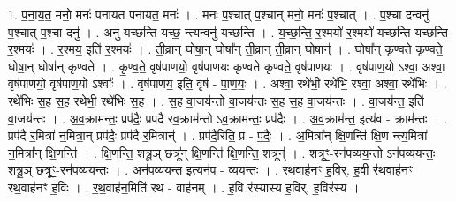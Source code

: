 \documentclass[17pt]{extarticle}
\begin{document}
1. प॒ना॒य॒त॒ मनो॒ मनः॑ पनायत पनायत॒ मनः॑ । . मनः॑ प॒श्चात् प॒श्चान् मनो॒ मनः॑ प॒श्चात् । . प॒श्चा दन्वनु॑ प॒श्चात् प॒श्चा दनु॑ । . अनु॑ यच्छन्ति यच्छ॒ न्त्यन्वनु॑ यच्छन्ति । . य॒च्छ॒न्ति॒ र॒श्मयो॑ र॒श्मयो॑ यच्छन्ति यच्छन्ति र॒श्मयः॑ । . र॒श्मय॒ इति॑ र॒श्मयः॑ । . ती॒व्रान् घोषा॒न् घोषा᳚न् ती॒व्रान् ती॒व्रान् घोषान्॑ । . घोषा᳚न् कृण्वते कृण्वते॒ घोषा॒न् घोषा᳚न् कृण्वते । . कृ॒ण्व॒ते॒ वृष॑पाणयो॒ वृष॑पाणयः कृण्वते कृण्वते॒ वृष॑पाणयः । . वृष॑पाण॒यो ऽश्वा॒ अश्वा॒ वृष॑पाणयो॒ वृष॑पाण॒यो ऽश्वाः᳚ । . वृष॑पाणय॒ इति॒ वृष॑ - पा॒ण॒यः॒ । . अश्वा॒ रथे॑भी॒ रथे॑भि॒ रश्वा॒ अश्वा॒ रथे॑भिः । . रथे॑भिः स॒ह स॒ह रथे॑भी॒ रथे॑भिः स॒ह । . स॒ह वा॒जय॑न्तो वा॒जय॑न्तः स॒ह स॒ह वा॒जय॑न्तः । . वा॒जय॑न्त॒ इति॑ वा॒जय॑न्तः । . अ॒व॒क्राम॑न्तः॒ प्रप॑दैः॒ प्रप॑दै रव॒क्राम॑न्तो ऽव॒क्राम॑न्तः॒ प्रप॑दैः । . अ॒व॒क्राम॑न्त॒ इत्य॑व - क्राम॑न्तः । . प्रप॑दै र॒मित्रा॑ न॒मित्रा॒न् प्रप॑दैः॒ प्रप॑दै र॒मित्रान्॑ । . प्रप॑दै॒रिति॒ प्र - प॒दैः॒ । . अ॒मित्रा᳚न् क्षि॒णन्ति॑ क्षि॒ण न्त्य॒मित्रा॑ न॒मित्रा᳚न् क्षि॒णन्ति॑ । . क्षि॒णन्ति॒ शत्रू॒ञ् छत्रू᳚न् क्षि॒णन्ति॑ क्षि॒णन्ति॒ शत्रून्॑ । . शत्रूꣳ॒॒-रन॑पव्यय॒न्तो ऽन॑पव्ययन्तः॒ शत्रू॒ञ् छत्रूꣳ॒॒-रन॑पव्ययन्तः । . अन॑पव्ययन्त॒ इत्यन॑प - व्य॒य॒न्तः॒ । . र॒थ॒वाह॑नꣳ ह॒विर्. ह॒वी र॑थ॒वाह॑नꣳ रथ॒वाह॑नꣳ ह॒विः । . र॒थ॒वाह॑न॒मिति॑ रथ - वाह॑नम् । . ह॒वि र॑स्यास्य ह॒विर्. ह॒विर॑स्य । \newline
\end{document}
